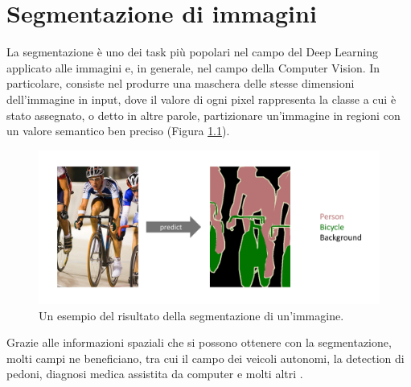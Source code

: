 \chapter{Segmentazione di immagini}
\label{chapter_seg}
 La segmentazione è uno dei task più popolari nel campo del Deep Learning applicato alle immagini e, in generale, nel campo della Computer Vision. In particolare, consiste nel produrre una maschera delle stesse dimensioni dell'immagine in input, dove il valore di ogni pixel rappresenta la classe a cui è stato assegnato, o detto in altre parole, partizionare un'immagine in regioni con un valore semantico ben preciso (Figura \ref{fig:example_sem_seg}).

\begin{figure}[b!]
    \centering
    \hspace*{-0.1in}
    \includegraphics[scale=0.37]{img/example_sem_seg.png}
    \caption{Un esempio del risultato della segmentazione di un'immagine.}
    \label{fig:example_sem_seg}
\end{figure}

Grazie alle informazioni spaziali che si possono ottenere con la segmentazione, molti campi ne beneficiano, tra cui il campo dei veicoli autonomi, la detection di pedoni, diagnosi medica assistita da computer e molti altri \cite{semsegsurvey}. 


